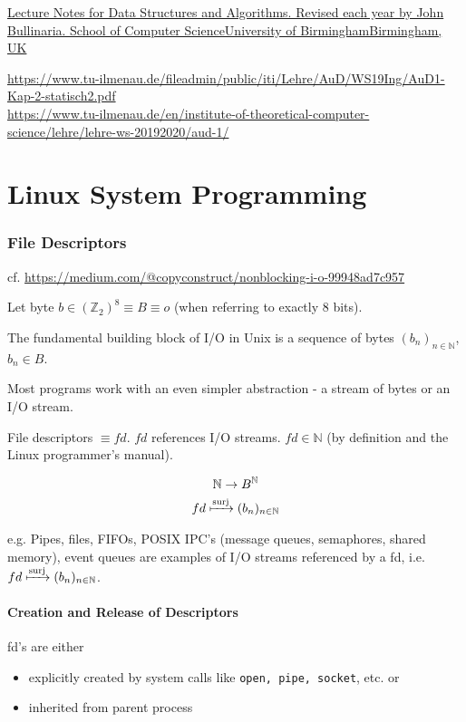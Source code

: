 \documentclass[10pt]{amsart}
\begin{document}
\href{https://www.cs.bham.ac.uk/~jxb/DSA/dsa.pdf}{Lecture Notes for Data Structures and Algorithms. Revised each year by John Bullinaria. School of Computer ScienceUniversity of BirminghamBirmingham, UK}

\url{https://www.tu-ilmenau.de/fileadmin/public/iti/Lehre/AuD/WS19Ing/AuD1-Kap-2-statisch2.pdf} \\
\url{https://www.tu-ilmenau.de/en/institute-of-theoretical-computer-science/lehre/lehre-ws-20192020/aud-1/} \\


\part{Linux System Programming}

\section{File Descriptors}

cf. \url{https://medium.com/@copyconstruct/nonblocking-i-o-99948ad7c957}

Let byte $b \in (\mathbb{Z}_2)^8 \equiv B \equiv o$ (when referring to exactly 8 bits).

The fundamental building block of I/O in Unix is a sequence of bytes $(b_n)_{n\in \mathbb{N}}$, $b_n \in B$. 

Most programs work with an even simpler abstraction - a stream of bytes or an I/O stream.

File descriptors $\equiv fd$. $fd$ references I/O streams.  $fd \in \mathbb{N}$ (by definition and the Linux programmer's manual).

\[
\begin{gathered}
\mathbb{N} \to B^{\mathbb{N}} \\
fd \xmapsto{\text{surj}} (b_n)_{n \in \mathbb{N}}
\end{gathered}
\]

e.g. Pipes, files, FIFOs, POSIX IPC's (message queues, semaphores, shared memory), event queues are examples of I/O streams referenced by a fd, i.e. $fd \xmapsto{\text{surj}} (b_n)_{n \in \mathbb{N}}$.

\subsection{Creation and Release of Descriptors}

fd's are either 
\begin{itemize}
	\item explicitly created by system calls like \texttt{open, pipe, socket}, etc. or 
	\item inherited from parent process
\end{itemize}
\end{document}

